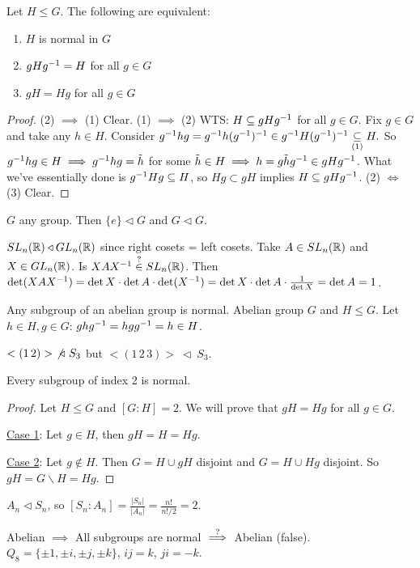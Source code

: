 \documentclass[]{article}
\begin{document}
\begin{theorem}
	Let $H\leq G$. The following are equivalent:
	\begin{enumerate}
		\item $H$ is normal in $G$
		\item $gHg^{-1} = H$ for all $g\in G$
		\item $gH = Hg$ for all $g\in G$
	\end{enumerate}
\end{theorem}
\begin{proof}
	(2) $\implies$ (1) Clear.
	(1) $\implies$ (2) WTS: $H \subseteq gHg^{-1}$ for all $g\in G$. Fix $g\in G$ and take any $h\in H$.
	Consider 
	$g^{-1} hg = g^{-1} h(g^{-1})^{-1} \in g^{-1} H(g^{-1})^{-1} \underset{(1)}{\subseteq} H.$
	So $g^{-1} hg \in H \implies g^{-1} hg = \tilde h$ for some $\tilde h\in H \implies h = g\tilde h g^{-1}\in gHg^{-1}$.
	What we've essentially done is $g^{-1} Hg \subseteq H$, so $Hg \subset gH$ implies $H\subseteq gHg^{-1}$.
	(2) $\iff$ (3) Clear.
\end{proof}
\begin{example}
	$G$ any group. Then $\{e\} \triangleleft G$ and $G\triangleleft G$.
\end{example}
\begin{example}
	$SL_n(\mathbb{R}) \triangleleft GL_n(\mathbb{R})$ since right cosets = left cosets.
	Take $A\in SL_n(\mathbb{R})$ and $X\in GL_n(\mathbb{R})$. Is $XAX^{-1} \overset{?}{\in} SL_n(\mathbb{R})$. 
	Then $\det(XAX^{-1}) = \det X\cdot \det A\cdot \det(X^{-1}) = \det X\cdot \det A \cdot \frac{1}{\det X} = \det A = 1$.
\end{example}
\begin{example}
	Any subgroup of an abelian group is normal. Abelian group $G$ and $H\leq G$. Let $h\in H,g\in G$: $ghg^{-1} = hgg^{-1} = h\in H$.
\end{example}
\begin{example}
	$<(1\,2)>\ \not\triangleleft\ S_3$ but $<(1\,2\,3)>\ \triangleleft\ S_3$.
\end{example}

\begin{theorem}
	Every subgroup of index 2 is normal.
\end{theorem}
\begin{proof}
	Let $H\leq G$ and $[G:H] = 2$. We will prove that $gH = Hg$ for all $g\in G$.

	\ul{Case 1}: Let $g\in H$, then $gH = H = Hg$.

	\ul{Case 2}: Let $g\notin H$. Then $G = H\cup gH$ disjoint and $G = H\cup Hg$ disjoint. So $gH = G\backslash H = Hg$.
\end{proof}
\begin{example}
	$A_n \triangleleft S_n$, so $[S_n:A_n] = \frac{|S_n|}{|A_n|} = \frac{n!}{n!/2} = 2$.
\end{example}
Abelian $\implies$ All subgroups are normal $\overset{?}{\implies}$ Abelian (false). $Q_8 = \{\pm 1,\pm i,\pm j, \pm k\}$, $ij = k$, $ji = -k$.
\end{document}

